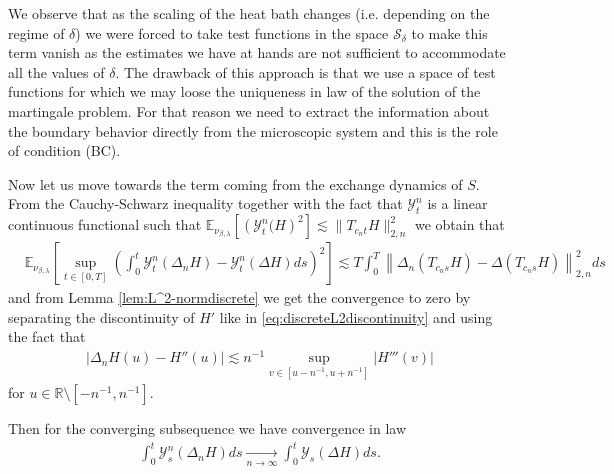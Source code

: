 \documentclass[a4paper, reqno, 12pt]{amsart}
\theoremstyle{plain}
\theoremstyle{definition}
\newcommand{\parent}[1]{\left( #1 \right)}
\newcommand{\ee}[1]{\mathbb{E}_{\nu_{\beta,\lambda}}\left[ #1 \right]}
\newcommand{\R}{\mathbb{R}}
\begin{document}
We observe  that as the scaling of the heat bath changes (i.e. depending on the regime of  $\delta$) we were forced to take test functions in the space $\mathcal S_\delta$ to make this term vanish as the estimates we have at hands are not sufficient to accommodate all the values of $\delta$. The drawback of this approach is that we use  a space of test functions for which  we may loose the uniqueness in law of the solution of the martingale problem. For that reason we need to extract the information about the boundary behavior directly from the microscopic system and this is the role of condition (BC).

\medskip

Now let us move towards the term coming from the exchange dynamics of $S$. From the Cauchy-Schwarz inequality together with the fact that $\mathcal Y_t^n$ is a linear continuous functional such that $\ee{\parent{\mathcal Y_t^n(H}^2}\lesssim \|T_{c_n t}H\|_{2,n}^2$
we obtain that 
\begin{align*}
   & \ee{ \sup_{t\in[0,T]} \left(\int_0^t\mathcal{Y}^n_t(\Delta_n H) - \mathcal{Y}^n_t(\Delta H) ds\right)^2} \lesssim T\int_0^T\left\|\Delta_n (T_{c_n s} H) -\Delta (T_{c_n s} H)\right\|_{2,n}^2 ds
\end{align*}
and from Lemma \ref{lem:L^2-normdiscrete} we get the convergence to zero by separating the discontinuity of $H'$ like in \eqref{eq:discreteL2discontinuity} and using the fact that 
\begin{align*}
    |\Delta_nH(u) - H''(u)|  \lesssim n^{-1} \sup_{v\in[u-n^{-1},u+n^{-1}]} |H'''(v)|
\end{align*}
for $u\in\R\setminus[-n^{-1},n^{-1}]$. 

Then for the converging subsequence we have convergence in law 
\begin{align*}
    \int_0^t \mathcal Y^n_s(\Delta_nH) ds \xrightarrow[n\to\infty]{} \int_0^t \mathcal Y_s(\Delta H) ds.
\end{align*}
\end{document}
